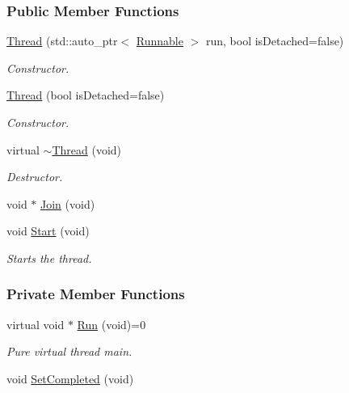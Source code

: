 \subsubsection*{Public Member Functions}
\begin{DoxyCompactItemize}
\item 
\hyperlink{group___core_a027b9eb38e4d59c076501b305b42f575}{Thread} (std\-::auto\-\_\-ptr$<$ \hyperlink{group___core_class_runnable}{Runnable} $>$ run, bool is\-Detached=false)
\begin{DoxyCompactList}\small\item\em Constructor. \end{DoxyCompactList}\item 
\hyperlink{group___core_a403714feecd93ac10c101a47b7649204}{Thread} (bool is\-Detached=false)
\begin{DoxyCompactList}\small\item\em Constructor. \end{DoxyCompactList}\item 
virtual \hyperlink{group___core_af1e25588ebe47a2a6d79ef8c686a992b}{$\sim$\-Thread} (void)
\begin{DoxyCompactList}\small\item\em Destructor. \end{DoxyCompactList}\item 
void $\ast$ \hyperlink{group___core_a8f33f7750321d5df9188033e7e3e300d}{Join} (void)
\item 
void \hyperlink{group___core_a2b42f82341afd2747ea093b6ac8b91cb}{Start} (void)
\begin{DoxyCompactList}\small\item\em Starts the thread. \end{DoxyCompactList}\end{DoxyCompactItemize}
\subsubsection*{Private Member Functions}
\begin{DoxyCompactItemize}
\item 
virtual void $\ast$ \hyperlink{group___core_ae46cda1b57e998b239a8b9710b0712e2}{Run} (void)=0
\begin{DoxyCompactList}\small\item\em Pure virtual thread main. \end{DoxyCompactList}\item 
void \hyperlink{group___core_ac32823199dc71dd77daba9bc9cb72c3e}{Set\-Completed} (void)
\end{DoxyCompactItemize}
